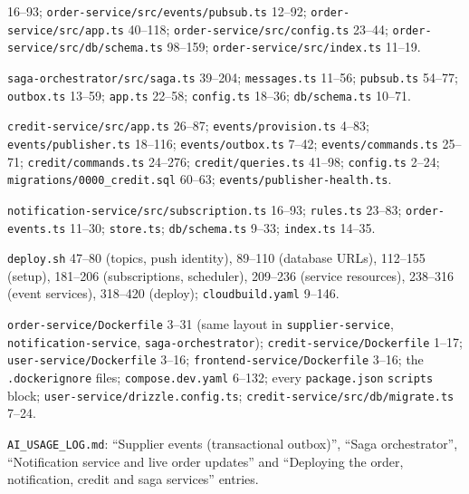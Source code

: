 \documentclass[11pt,a4paper]{article}
\newcommand{\code}[1]{\nolinkurl{#1}}
\begin{document}
\begin{description}[style=nextline, leftmargin=0pt, labelsep=0pt, itemsep=3pt]
16--93; \code{order-service/src/events/pubsub.ts} 12--92; \code{order-service/src/app.ts}
40--118; \code{order-service/src/config.ts} 23--44; \code{order-service/src/db/schema.ts}
98--159; \code{order-service/src/index.ts} 11--19.
\item[Saga (Sections~\ref{sec:order}, \ref{sec:failure})]
\code{saga-orchestrator/src/saga.ts} 39--204; \code{messages.ts} 11--56; \code{pubsub.ts}
54--77; \code{outbox.ts} 13--59; \code{app.ts} 22--58; \code{config.ts} 18--36;
\code{db/schema.ts} 10--71.
\item[Credit (Sections~\ref{sec:topics}, \ref{sec:order}, \ref{sec:failure})]
\code{credit-service/src/app.ts} 26--87; \code{events/provision.ts} 4--83;
\code{events/publisher.ts} 18--116; \code{events/outbox.ts} 7--42;
\code{events/commands.ts} 25--71; \code{credit/commands.ts} 24--276;
\code{credit/queries.ts} 41--98; \code{config.ts} 2--24;
\code{migrations/0000_credit.sql} 60--63; \code{events/publisher-health.ts}.
\item[Notification (Sections~\ref{sec:mental}, \ref{sec:delivery})]
\code{notification-service/src/subscription.ts} 16--93; \code{rules.ts} 23--83;
\code{order-events.ts} 11--30; \code{store.ts}; \code{db/schema.ts} 9--33;
\code{index.ts} 14--35.
\item[Cloud transport (Sections~\ref{sec:transport}, \ref{sec:cloudbuild})]
\code{deploy.sh} 47--80 (topics, push identity), 89--110 (database URLs), 112--155
(setup), 181--206 (subscriptions, scheduler), 209--236 (service resources), 238--316
(event services), 318--420 (deploy); \code{cloudbuild.yaml} 9--146.
\item[Containers (Sections~\ref{sec:dockerfiles}--\ref{sec:dbs})]
\code{order-service/Dockerfile} 3--31 (same layout in \code{supplier-service},
\code{notification-service}, \code{saga-orchestrator}); \code{credit-service/Dockerfile}
1--17; \code{user-service/Dockerfile} 3--16; \code{frontend-service/Dockerfile} 3--16;
the \code{.dockerignore} files; \code{compose.dev.yaml} 6--132; every
\code{package.json} \code{scripts} block; \code{user-service/drizzle.config.ts};
\code{credit-service/src/db/migrate.ts} 7--24.
\item[Evidence of earlier runs (Section~\ref{sec:transport})]
\code{AI_USAGE_LOG.md}: ``Supplier events (transactional outbox)'', ``Saga
orchestrator'', ``Notification service and live order updates'' and ``Deploying the
order, notification, credit and saga services'' entries.
\end{description}
\end{document}
